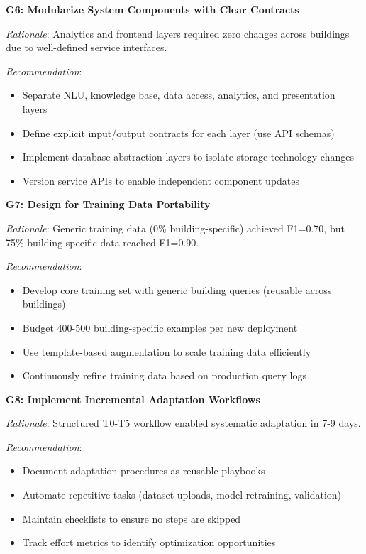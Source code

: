 \documentclass[acmlarge]{acmart}
\begin{document}
\textbf{G6: Modularize System Components with Clear Contracts}

\textit{Rationale}: Analytics and frontend layers required zero changes across buildings due to well-defined service interfaces.

\textit{Recommendation}:
\begin{itemize}
    \item Separate NLU, knowledge base, data access, analytics, and presentation layers
    \item Define explicit input/output contracts for each layer (use API schemas)
    \item Implement database abstraction layers to isolate storage technology changes
    \item Version service APIs to enable independent component updates
\end{itemize}

\textbf{G7: Design for Training Data Portability}

\textit{Rationale}: Generic training data (0\% building-specific) achieved F1=0.70, but 75\% building-specific data reached F1=0.90.

\textit{Recommendation}:
\begin{itemize}
    \item Develop core training set with generic building queries (reusable across buildings)
    \item Budget 400-500 building-specific examples per new deployment
    \item Use template-based augmentation to scale training data efficiently
    \item Continuously refine training data based on production query logs
\end{itemize}

\textbf{G8: Implement Incremental Adaptation Workflows}

\textit{Rationale}: Structured T0-T5 workflow enabled systematic adaptation in 7-9 days.

\textit{Recommendation}:
\begin{itemize}
    \item Document adaptation procedures as reusable playbooks
    \item Automate repetitive tasks (dataset uploads, model retraining, validation)
    \item Maintain checklists to ensure no steps are skipped
    \item Track effort metrics to identify optimization opportunities
\end{itemize}
\end{document}
